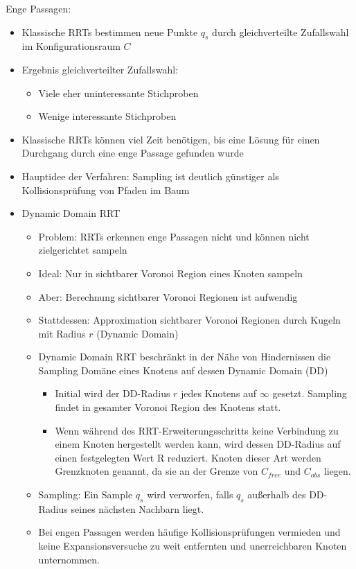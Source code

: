 \documentclass[paper=a4, fontsize=11pt]{scrartcl} %
\numberwithin{equation}{section} %
\numberwithin{figure}{section} %
\numberwithin{table}{section} %
\begin{document}
Enge Passagen:
\begin{itemize}
\item Klassische RRTs bestimmen neue Punkte $q_s$ durch gleichverteilte Zufallswahl im Konfigurationsraum $C$
\item Ergebnis gleichverteilter Zufallswahl:
\begin{itemize}
\item Viele eher uninteressante Stichproben
\item Wenige interessante Stichproben
\end{itemize}
\item Klassische RRTs können viel Zeit benötigen, bis eine Lösung für einen Durchgang durch eine enge Passage gefunden wurde
\item Hauptidee der Verfahren: Sampling ist deutlich günstiger als Kollisionsprüfung von Pfaden im Baum
\item Dynamic Domain RRT
\begin{itemize}
\item Problem: RRTs erkennen enge Passagen nicht und können nicht zielgerichtet sampeln
\item Ideal: Nur in sichtbarer Voronoi Region eines Knoten sampeln
\item Aber: Berechnung sichtbarer Voronoi Regionen ist aufwendig
\item Stattdessen: Approximation sichtbarer Voronoi Regionen durch Kugeln mit Radius $r$ (Dynamic Domain)
\item Dynamic Domain RRT beschränkt in der Nähe von Hindernissen die Sampling Domäne eines Knotens auf dessen Dynamic Domain (DD)
\begin{itemize}
\item Initial wird der DD-Radius $r$ jedes Knotens auf $\infty$ gesetzt. Sampling findet in gesamter Voronoi Region des Knotens statt.
\item Wenn während des RRT-Erweiterungsschritts keine Verbindung zu einem Knoten hergestellt werden kann, wird dessen DD-Radius auf einen festgelegten Wert R reduziert. Knoten dieser Art werden Grenzknoten genannt, da sie an der Grenze von $C_{free}$ und $C_{obs}$ liegen.
\end{itemize}
\item Sampling: Ein Sample $q_s$ wird verworfen, falls $q_s$ außerhalb des DD-Radius seines nächsten Nachbarn liegt.
\item Bei engen Passagen werden häufige Kollisionsprüfungen vermieden und keine Expansionsversuche zu weit entfernten und unerreichbaren Knoten unternommen.

\end{itemize}
\end{itemize}
\end{document}
